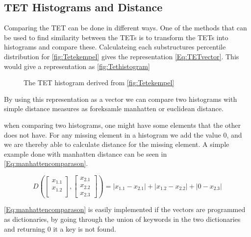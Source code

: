 \subsection{TET Histograms and Distance}
	Comparing the TET can be done in different ways. One of the methods that can be used to find similarity between the TETs is to transform the TETs into histograms and compare these\cite{JAEGER201330}. Calculateing each substructures percentile distribution for \autoref{fig:Tetekempel} gives the representation \autoref{Eq:TETvector}. This would give a representation as \autoref{fig:Tethistogram}
	
	\begin{figure}[H]
		\centering
		\begin{adjustbox}{width=0.5\textwidth}
			
		\end{adjustbox}
		\caption{The TET histogram derived from \autoref{fig:Tetekempel}}
		\label{fig:Tethistogram}
	\end{figure}
	
	By using this representation as a vector we can compare two histograms with simple distance measures as foreksamle manhatten or euclidean distance.
	
	when comparing two histograms, one might have some elements that the other does not have. For any missing element in a histogram we add the value $0$, and we are thereby able to calculate distance for the missing element. A simple example done with manhatten distance can be seen in \autoref{Eq:manhattencomparason}\cite{singh2013k}.
	
	\begin{equation}\label{Eq:manhattencomparason}
	D(\begin{bmatrix}
	x_{1.1} \\
	x_{1.2} \\
	\end{bmatrix},
	\begin{bmatrix}
	x_{2.1} \\
	x_{2.2} \\
	x_{2.3}
	\end{bmatrix})= |x_{1.1} - x_{2.1}| + |x_{1.2} - x_{2.2}| + |0 - x_{2.3}|
	\end{equation}
	
	\autoref{Eq:manhattencomparason} is easily implemented if the vectors are programmed as dictionaries, by going through the union of keywords in the two dictionaries and returning 0 it a key is not found.
